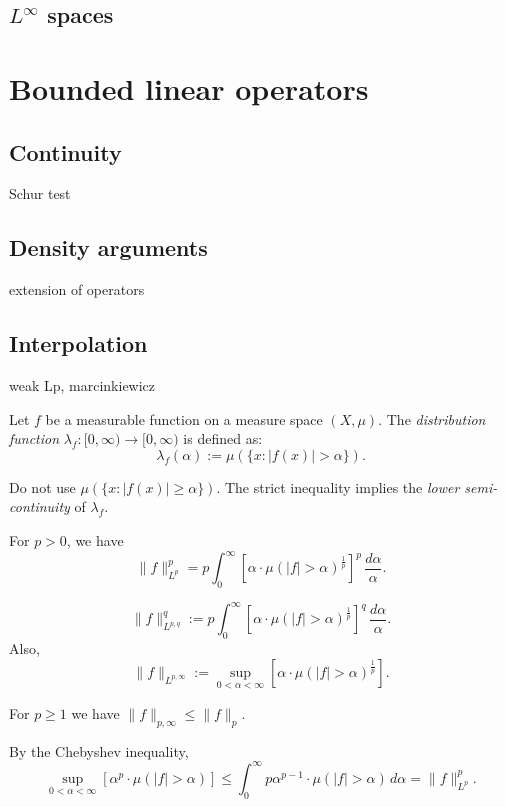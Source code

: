 \documentclass{../../large}
\begin{document}
\section{$L^\infty$ spaces}








\chapter{Bounded linear operators}
\section{Continuity}
Schur test

\section{Density arguments}
extension of operators

\section{Interpolation}
weak Lp, marcinkiewicz



\begin{defn}
Let $f$ be a measurable function on a measure space $(X,\mu)$.
The \emph{distribution function} $\lambda_f:[0,\infty)\to [0,\infty)$ is defined as:
\[\lambda_f(\alpha):=\mu(\{x:|f(x)|>\alpha\}).\]
\end{defn}


Do not use $\mu(\{x:|f(x)|\ge\alpha\})$.
The strict inequality implies the \emph{lower semi-continuity} of $\lambda_f$.

\begin{parts}
\item For $p>0$, we have
\[\|f\|_{L^p}^p=p\int_0^\infty\left[\alpha\cdot\mu(|f|>\alpha)^\frac1p\right]^p\,\frac{d\alpha}\alpha.\]
\end{parts}
\begin{defn}
\[\|f\|_{L^{p,q}}^q:=p\int_0^\infty\left[\alpha\cdot\mu(|f|>\alpha)^\frac1p\right]^q\,\frac{d\alpha}\alpha.\]
Also,
\[\|f\|_{L^{p,\infty}}:=\sup_{0<\alpha<\infty}\left[\alpha\cdot\mu(|f|>\alpha)^\frac1p\right].\]
\end{defn}
\begin{thm}
For $p\ge1$ we have $\|f\|_{p,\infty}\le\|f\|_p$.
\end{thm}
\begin{pf}
By the Chebyshev inequality,
\[\sup_{0<\alpha<\infty}\left[\alpha^p\cdot\mu(|f|>\alpha)\right]\le\int_0^\infty p\alpha^{p-1}\cdot\mu(|f|>\alpha)\,d\alpha=\|f\|_{L^p}^p.\]

\end{pf}
\end{document}
